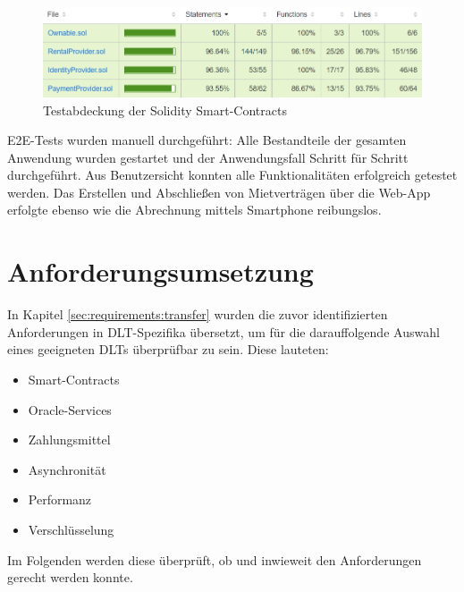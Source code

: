 \begin{figure}[h]
 \centering
 \includegraphics[width=1.0\textwidth]{gfx/coverage.png}
 \caption{Testabdeckung der Solidity Smart-Contracts}
 \label{fig:chapter07:coverage}
\end{figure}

\ac{E2E}-Tests wurden manuell durchgeführt: Alle Bestandteile der gesamten Anwendung wurden gestartet und der Anwendungsfall Schritt für Schritt durchgeführt. Aus Benutzersicht konnten alle Funktionalitäten erfolgreich getestet werden. Das Erstellen und Abschließen von Mietverträgen über die Web-App erfolgte ebenso wie die Abrechnung mittels Smartphone reibungslos.


\section{Anforderungsumsetzung}
\label{sec:implementation:requirements}
In Kapitel \ref{sec:requirements:transfer} wurden die zuvor identifizierten Anforderungen in \ac{DLT}-Spezifika übersetzt, um für die darauffolgende Auswahl eines geeigneten \ac{DLT}s überprüfbar zu sein. Diese lauteten:
\begin{itemize}
  \item Smart-Contracts
  \item Oracle-Services
  \item Zahlungsmittel
  \item Asynchronität
  \item Performanz
  \item Verschlüsselung
\end{itemize}
Im Folgenden werden diese überprüft, ob und inwieweit den Anforderungen gerecht werden konnte.

